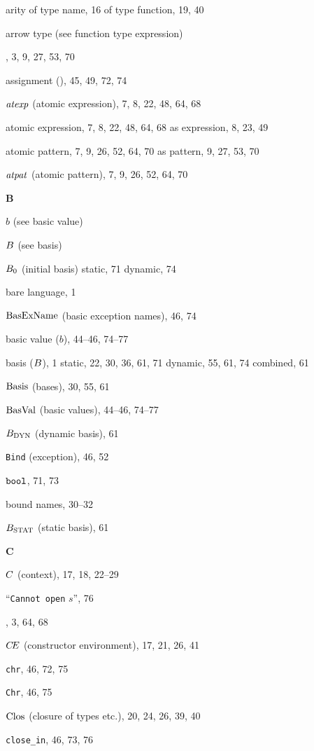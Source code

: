 \begin{theindex}
\item arity 
\subitem of type name, 16
\subitem of type function, 19, 40
\item arrow type (see function type expression) 
\item \AS, 3, 9, 27, 53, 70
\item assignment (\ml{:=}), 45, 49, 72, 74
\item ${\it atexp}$ (atomic expression), 7, 8, 22, 48, 64, 68
\item atomic expression, 7, 8, 22, 48, 64, 68
\subitem as expression, 8, 23, 49
\item atomic pattern, 7, 9, 26, 52, 64, 70
\subitem as pattern, 9, 27, 53, 70
\item ${\it atpat}$ (atomic pattern), 7, 9, 26, 52, 64, 70
\indexspace
\parbox{65mm}{\hfil{\large\bf B}\hfil}
\indexspace
\item $b$ (see basic value) 
\item $B$ (see basis) 
\item $B_0$ (initial basis) 
\subitem static, 71
\subitem dynamic, 74
\item bare language, 1
\item ${\rm BasExName}$ (basic exception names), 46, 74
\item basic value ($b$), 44--46, 74--77
\item basis ($B$), 1
\subitem static, 22, 30, 36, 61, 71
\subitem dynamic, 55, 61, 74
\subitem combined, 61
\item ${\rm Basis}$ (bases), 30, 55, 61
\item ${\rm BasVal}$ (basic values), 44--46, 74--77
\item $B_{\rm DYN}$ (dynamic basis), 61
\item {\tt Bind} (exception), 46, 52
\item $\mbox{\tt bool}$, 71, 73
\item bound names, 30--32
\item $B_{\rm STAT}$ (static basis), 61
\indexspace
\parbox{65mm}{\hfil{\large\bf C}\hfil}
\indexspace
\item $C$ (context), 17, 18, 22--29
\item ``{\tt Cannot open} $s$'', 76
\item \CASE, 3, 64, 68
\item $\mbox{$C\!E$}$ (constructor environment), 17, 21, 26, 41
\item {\tt chr}, 46, 72, 75
\item {\tt Chr}, 46, 75
\item ${\rm Clos}_{}$ (closure of types etc.), 20, 24, 26, 39, 40
\item \verb+close_in+, 46, 73, 76

\end{theindex}
